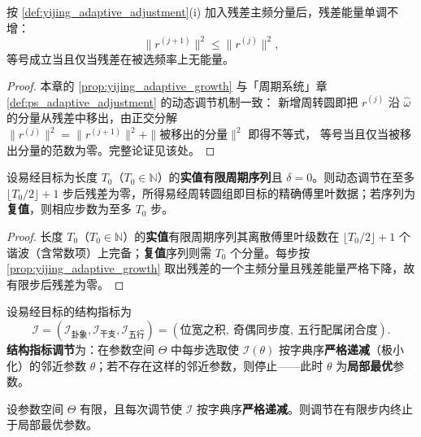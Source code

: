 \begin{proposition}[数量调节的单调性]\label{prop:yijing_adaptive_growth}
按 \cref{def:yijing_adaptive_adjustment}(i) 加入残差主频分量后，残差能量单调不增：
\[
\|r^{(j+1)}\|^2\le\|r^{(j)}\|^2,
\]
等号成立当且仅当残差在被选频率上无能量。
\end{proposition}

\begin{proof}
本章的 \cref{prop:yijing_adaptive_growth} 与「周期系统」章 \cref{def:ps_adaptive_adjustment} 的动态调节机制一致：
新增周转圆即把 $r^{(j)}$ 沿 $\hat\omega$ 的分量从残差中移出，由正交分解
$\|r^{(j)}\|^2=\|r^{(j+1)}\|^2+\|\text{被移出的分量}\|^2$ 即得不等式，
等号当且仅当被移出分量的范数为零。完整论证见该处。
\end{proof}

\begin{theorem}[动态调节的收敛性]\label{thm:yijing_adaptive_convergence}
设易经目标为长度 $T_0$（$T_0\in\mathbb N$）的\textbf{实值有限周期序列}且 $\delta=0$。则动态调节在至多 $\lfloor T_0/2\rfloor+1$ 步后残差为零，所得易经周转圆组即目标的精确傅里叶数据；若序列为\textbf{复值}，则相应步数为至多 $T_0$ 步。
\end{theorem}

\begin{proof}
长度 $T_0$（$T_0\in\mathbb N$）的\textbf{实值}有限周期序列其离散傅里叶级数在 $\lfloor T_0/2\rfloor+1$ 个谐波（含常数项）上完备；\textbf{复值}序列则需 $T_0$ 个分量。每步按 \cref{prop:yijing_adaptive_growth} 取出残差的一个主频分量且残差能量严格下降，故有限步后残差为零。
\end{proof}

\begin{definition}[结构指标调节]\label{def:yijing_structure_metric_adjustment}
设易经目标的结构指标为
\[
\mathcal I=(\mathcal I_{\text{卦象}},\mathcal I_{\text{干支}},\mathcal I_{\text{五行}})
=(\text{位宽之积},\ \text{奇偶同步度},\ \text{五行配属闭合度}).
\]
\textbf{结构指标调节}为：在参数空间 $\Theta$ 中每步选取使 $\mathcal I(\theta)$ 按字典序\textbf{严格递减}（极小化）的邻近参数 $\theta$；若不存在这样的邻近参数，则停止——此时 $\theta$ 为\textbf{局部最优}参数。
\end{definition}

\begin{proposition}[结构指标调节的有限收敛]\label{prop:yijing_structure_metric_convergence}
设参数空间 $\Theta$ 有限，且每次调节使 $\mathcal I$ 按字典序\textbf{严格递减}。则调节在有限步内终止于局部最优参数。
\end{proposition}

